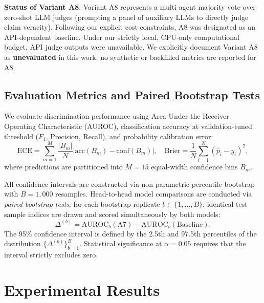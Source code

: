 \documentclass[pdflatex,sn-mathphys,Numbered]{sn-jnl}
\begin{document}
\noindent \textbf{Status of Variant A8}: Variant A8 represents a multi-agent majority vote over zero-shot LLM judges (prompting a panel of auxiliary LLMs to directly judge claim veracity). Following our explicit cost constraints, A8 was designated as an API-dependent baseline. Under our strictly local, CPU-only computational budget, API judge outputs were unavailable. We explicitly document Variant A8 as \textbf{unevaluated} in this work; no synthetic or backfilled metrics are reported for A8.

\subsection{Evaluation Metrics and Paired Bootstrap Tests}\label{subsec:metrics}

We evaluate discrimination performance using Area Under the Receiver Operating Characteristic (AUROC), classification accuracy at validation-tuned threshold ($F_1$, Precision, Recall), and probability calibration error:
\begin{equation}
\mathrm{ECE} = \sum_{m=1}^M \frac{|B_m|}{N} \left| \mathrm{acc}(B_m) - \mathrm{conf}(B_m) \right|, \quad \mathrm{Brier} = \frac{1}{N} \sum_{i=1}^N (\hat{p}_i - y_i)^2,
\end{equation}
where predictions are partitioned into $M=15$ equal-width confidence bins $B_m$.

All confidence intervals are constructed via non-parametric percentile bootstrap~\cite{efron1993bootstrap} with $B=1,000$ resamples. Head-to-head model comparisons are conducted via \emph{paired bootstrap tests}: for each bootstrap replicate $b \in \{1, \dots, B\}$, identical test sample indices are drawn and scored simultaneously by both models:
\begin{equation}
\Delta^{(b)} = \mathrm{AUROC}_b(\text{A7}) - \mathrm{AUROC}_b(\text{Baseline}).
\end{equation}
The 95\% confidence interval is defined by the 2.5th and 97.5th percentiles of the distribution $\{\Delta^{(b)}\}_{b=1}^B$. Statistical significance at $\alpha=0.05$ requires that the interval strictly excludes zero.

\section{Experimental Results}\label{sec:results}
\end{document}
